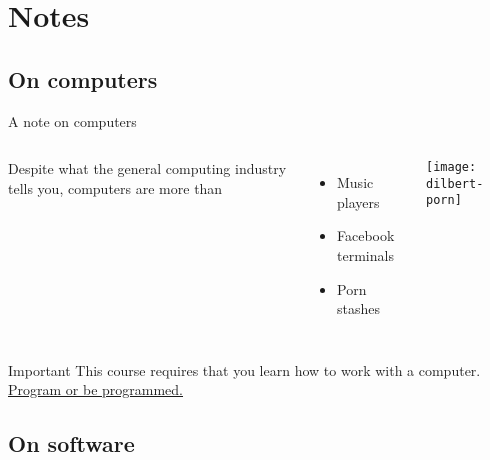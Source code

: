 \documentclass[t]{beamer}
\begin{document}
  
  \section{Notes}
  
  \subsection{On computers}

  \begin{frame}[t]{A note on computers}
  
    \begin{columns}[T]

      
      Despite what the general computing industry tells you, %
			computers are more than\\[1em]   

      \begin{itemize}
        \item Music players
        \item Facebook terminals
        \item Porn stashes
      \end{itemize}


      \texttt{[image: dilbert-porn]}

    \end{columns}
  
      \vspace{1em}
      
      \begin{alertblock}{Important}
        This course requires that you learn how to work with a computer. %
          \href{http://www.orbooks.com/catalog/program/}{Program or be programmed.}
      \end{alertblock}
      
  \end{frame}


  \subsection{On software}
\end{document}
